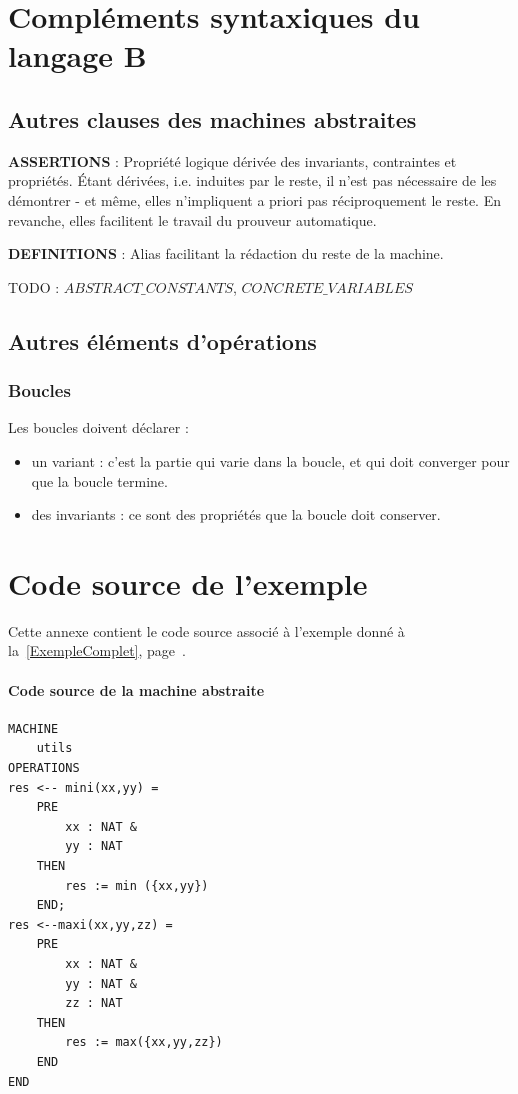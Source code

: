 \documentclass[10pt,a4paper]{article}
\begin{document}
{\begin{itemize}
\end{itemize}

\section{Compléments syntaxiques du langage B}
\label{ComplementSyntaxique}
\subsection{Autres clauses des machines abstraites}

\textbf{ASSERTIONS} : Propriété logique dérivée des invariants, contraintes et propriétés. Étant dérivées, i.e. induites par le reste, il n'est pas nécessaire de les démontrer - et même, elles n'impliquent a priori pas réciproquement le reste. En revanche, elles facilitent le travail du prouveur automatique.

\textbf{DEFINITIONS} : Alias facilitant la rédaction du reste de la machine.

TODO : $ABSTRACT\_CONSTANTS$, $CONCRETE\_VARIABLES$

\subsection{Autres éléments d'opérations}

\subsubsection{Boucles}

Les boucles doivent déclarer :
\begin{itemize}
\item un variant : c'est la partie qui varie dans la boucle, et qui doit converger pour que la boucle termine.
\item des invariants : ce sont des propriétés que la boucle doit conserver.
\end{itemize}

\section{Code source de l'exemple}
\label{CodeSource}
Cette annexe contient le code source associé à l'exemple donné à la~\cref{ExempleComplet}, page~\pageref{ExempleComplet}.

\paragraph{Code source de la machine abstraite}
\begin{verbatim}
MACHINE
    utils
OPERATIONS
res <-- mini(xx,yy) =
    PRE
        xx : NAT &
        yy : NAT
    THEN
        res := min ({xx,yy})
    END;
res <--maxi(xx,yy,zz) =
    PRE
        xx : NAT &
        yy : NAT &
        zz : NAT
    THEN
        res := max({xx,yy,zz})
    END
END
\end{verbatim}

}
\end{document}
